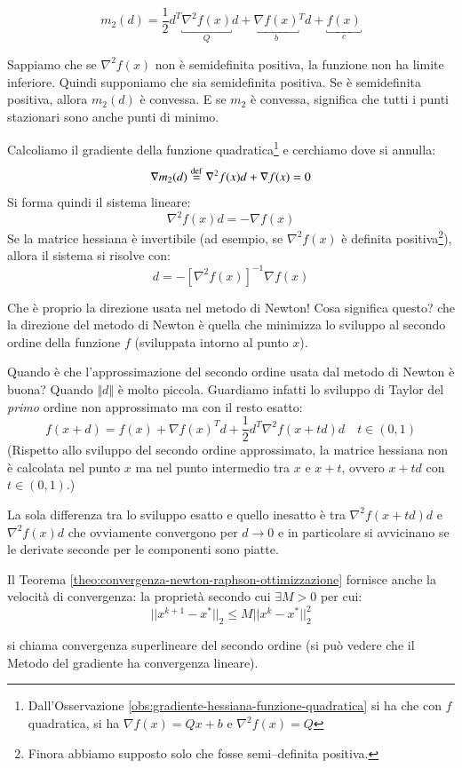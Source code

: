 $$ m_2(d) = \frac{1}{2} d^{T} \underbracket{\nabla^2 f(x)}_{Q}d + \underbracket{\nabla f(x)}_{b} {^T} d + \underbracket{f(x)}_{c}$$

Sappiamo che se $\nabla^2 f(x)$ non \`e semidefinita positiva, la
funzione non ha limite inferiore. Quindi supponiamo che sia
semidefinita positiva. Se \`e semidefinita positiva, allora $m_2(d)$ \`e
convessa. E se $m_2$ \`e convessa, significa che tutti i punti
stazionari sono anche punti di minimo.

Calcoliamo il gradiente della funzione
quadratica\footnote{Dall'Osservazione
\ref{obs:gradiente-hessiana-funzione-quadratica} si ha che con $f$
quadratica, si ha $\nabla f(x) = Qx + b$ e $\nabla^2 f(x) = Q$} e
cerchiamo dove si annulla:
$$ \nabla m_2(d) \defeq \nabla^{2} f(x) d + \nabla f(x)=0$$
Si forma quindi il sistema lineare:
$$ \nabla^{2} f(x) d = - \nabla f(x)$$
Se la matrice hessiana \`e invertibile (ad esempio, se $\nabla^{2} f(x)$
\`e definita positiva\footnote{Finora abbiamo supposto solo che fosse
semi--definita positiva.}), allora il sistema si risolve con:
$$ d = - [\nabla^2f(x) ]^{-1} \nabla f(x)$$

Che \`e proprio la direzione usata nel metodo di Newton! Cosa significa
questo? che la direzione del metodo di Newton \`e quella che minimizza
lo sviluppo al secondo ordine della funzione $f$ (sviluppata intorno
al punto $x$).

\begin{observation} Quando \`e che l'approssimazione del secondo ordine
usata dal metodo di Newton \`e buona? Quando $\Vert d \Vert$ \`e molto
piccola. Guardiamo infatti lo sviluppo di Taylor del \emph{primo}
ordine non approssimato ma con il resto esatto:
$$ f(x+d) = f(x) + \nabla f(x)^{T}d+ \frac{1}{2} d^{T} \nabla^{2} f(x+td)d
\quad t\in(0,1)$$ (Rispetto allo sviluppo del secondo ordine
approssimato, la matrice hessiana non \`e calcolata nel punto $x$ ma nel
punto intermedio tra $x$ e $x+t$, ovvero $x+td$ con $t\in(0,1)$.)

La sola differenza tra lo sviluppo esatto e quello inesatto \`e tra
$\nabla^{2} f(x+td)d$ e $\nabla^{2} f(x)d$ che ovviamente convergono
per $d \to 0$ e in particolare si avvicinano se le derivate seconde
per le componenti sono piatte.
\end{observation}

\begin{observation} Il Teorema
\ref{theo:convergenza-newton-raphson-ottimizzazione} fornisce anche la
velocit\`a di convergenza: la propriet\`a secondo cui $\exists M > 0 $ per
cui:
$$|| x^{k+1} -x^{*}||_{2} \leq M ||x^{k} - x^{*}||_{2}^{2}$$

si chiama convergenza superlineare del secondo ordine (si può vedere
che il Metodo del gradiente ha convergenza lineare).
\end{observation}

